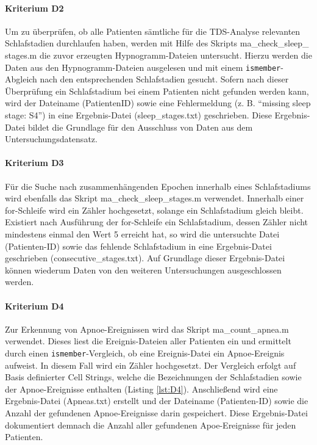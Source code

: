 \paragraph{Kriterium D2} Um zu überprüfen, ob alle Patienten sämtliche für die \acs{TDS}-Analyse relevanten Schlafstadien durchlaufen haben, werden mit Hilfe des Skripts ma\_check\_sleep\_ stages.m die zuvor erzeugten Hypnogramm-Dateien untersucht. Hierzu werden die Daten aus den Hypnogramm-Dateien ausgelesen und mit einem \texttt{ismember}-Abgleich nach den entsprechenden Schlafstadien gesucht. Sofern nach dieser Überprüfung ein Schlafstadium bei einem Patienten nicht gefunden werden kann, wird der Dateiname (PatientenID) sowie eine Fehlermeldung (z. B. "`missing sleep stage: S4"') in eine Ergebnis-Datei (sleep\_stages.txt) geschrieben. Diese Ergebnis-Datei bildet die Grundlage für den Ausschluss von Daten aus dem Untersuchungsdatensatz.

\paragraph{Kriterium D3} Für die Suche nach zusammenhängenden Epochen innerhalb eines Schlafstadiums wird ebenfalls das Skript ma\_check\_sleep\_stages.m verwendet. Innerhalb einer for-Schleife wird ein Zähler hochgesetzt, solange ein Schlafstadium gleich bleibt. Existiert nach Ausführung der for-Schleife ein Schlafstadium, dessen Zähler nicht mindestens einmal den Wert 5 erreicht hat, so wird die untersuchte Datei (Patienten-ID) sowie das fehlende Schlafstadium in eine Ergebnis-Datei geschrieben (consecutive\_stages.txt). Auf Grundlage dieser Ergebnis-Datei können wiederum Daten von den weiteren Untersuchungen ausgeschlossen werden.

\paragraph{Kriterium D4} Zur Erkennung von Apnoe-Ereignissen wird das Skript ma\_count\_apnea.m verwendet. Dieses liest die Ereignis-Dateien aller Patienten ein und ermittelt durch einen \texttt{ismember}-Vergleich, ob eine Ereignis-Datei ein Apnoe-Ereignis aufweist. In diesem Fall wird ein Zähler hochgesetzt. Der Vergleich erfolgt auf Basis definierter Cell Strings, welche die Bezeichnungen der Schlafstadien sowie der Apnoe-Ereignisse enthalten (Listing \ref{lst:D4}). Anschließend wird eine Ergebnis-Datei (Apneas.txt) erstellt und der Dateiname (Patienten-ID) sowie die Anzahl der gefundenen Apnoe-Ereignisse darin gespeichert. Diese Ergebnis-Datei dokumentiert demnach die Anzahl aller gefundenen Apoe-Ereignisse für jeden Patienten.\\


